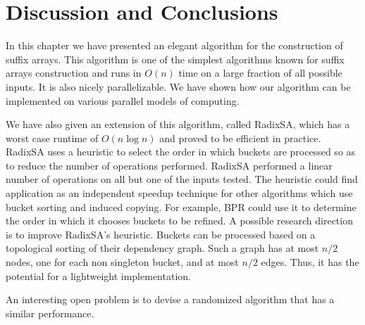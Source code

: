 \section{Discussion and Conclusions}

In this chapter we have presented an elegant algorithm for the construction of
suffix arrays. This algorithm is one of the simplest algorithms known for
suffix arrays construction and runs in $O(n)$ time on a large fraction of all
possible inputs. It is also nicely parallelizable. We have shown how our
algorithm can be implemented on various parallel models of computing. 

We have also given an extension of this algorithm, called RadixSA, which has a worst
case runtime of $O(n \log n)$ and proved to be efficient in practice. 
RadixSA uses a heuristic to select the order in which buckets are 
processed so as to reduce the number of operations performed. RadixSA performed a linear number 
of operations on all but one 
of the inputs tested. The heuristic could find application as an independent speedup technique 
for other algorithms which use bucket sorting and induced copying. For example, BPR could
use it to determine the order in which it chooses buckets to be refined.
A possible research direction is to improve RadixSA's heuristic. Buckets can be processed based on 
a topological sorting of their dependency graph. Such a graph has at most $n/2$ 
nodes, one for each non singleton bucket, and at most $n/2$ edges. Thus, it
has the potential for a lightweight implementation. 
 
An interesting open problem is to devise a randomized algorithm that has a
similar performance. 